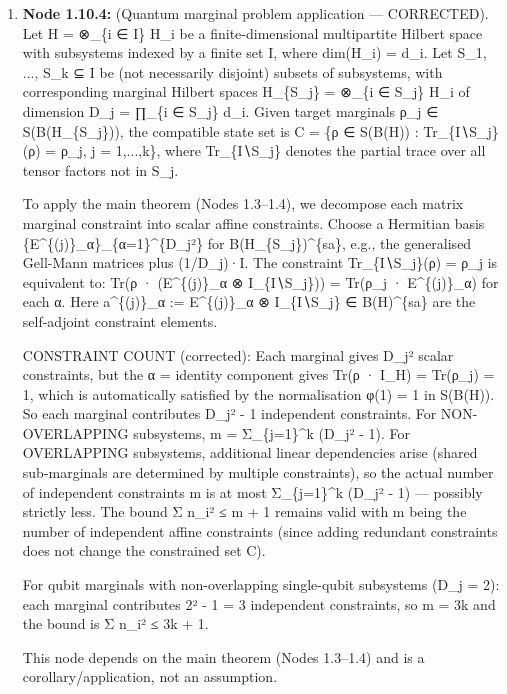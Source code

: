 \documentclass{article}
\begin{document}
\begin{enumerate}
\begin{enumerate}
  Type: claim, Inference: assumption, Status: pending, Taint: unresolved

\item \textbf{Node 1.10.4:} (Quantum marginal problem application — CORRECTED). Let H = ⊗\_\{i ∈ I\} H\_i be a finite-dimensional multipartite Hilbert space with subsystems indexed by a finite set I, where dim(H\_i) = d\_i. Let S\_1, ..., S\_k ⊆ I be (not necessarily disjoint) subsets of subsystems, with corresponding marginal Hilbert spaces H\_\{S\_j\} = ⊗\_\{i ∈ S\_j\} H\_i of dimension D\_j = ∏\_\{i ∈ S\_j\} d\_i. Given target marginals ρ\_j ∈ S(B(H\_\{S\_j\})), the compatible state set is C = \{ρ ∈ S(B(H)) : Tr\_\{I∖S\_j\}(ρ) = ρ\_j, j = 1,...,k\}, where Tr\_\{I∖S\_j\} denotes the partial trace over all tensor factors not in S\_j.

To apply the main theorem (Nodes 1.3–1.4), we decompose each matrix marginal constraint into scalar affine constraints. Choose a Hermitian basis \{E\textasciicircum{}\{(j)\}\_α\}\_\{α=1\}\textasciicircum{}\{D\_j²\} for B(H\_\{S\_j\})\textasciicircum{}\{sa\}, e.g., the generalised Gell-Mann matrices plus (1/D\_j)·I. The constraint Tr\_\{I∖S\_j\}(ρ) = ρ\_j is equivalent to: Tr(ρ · (E\textasciicircum{}\{(j)\}\_α ⊗ I\_\{I∖S\_j\})) = Tr(ρ\_j · E\textasciicircum{}\{(j)\}\_α) for each α. Here a\textasciicircum{}\{(j)\}\_α := E\textasciicircum{}\{(j)\}\_α ⊗ I\_\{I∖S\_j\} ∈ B(H)\textasciicircum{}\{sa\} are the self-adjoint constraint elements.

CONSTRAINT COUNT (corrected): Each marginal gives D\_j² scalar constraints, but the α = identity component gives Tr(ρ · I\_H) = Tr(ρ\_j) = 1, which is automatically satisfied by the normalisation φ(1) = 1 in S(B(H)). So each marginal contributes D\_j² - 1 independent constraints. For NON-OVERLAPPING subsystems, m = Σ\_\{j=1\}\textasciicircum{}k (D\_j² - 1). For OVERLAPPING subsystems, additional linear dependencies arise (shared sub-marginals are determined by multiple constraints), so the actual number of independent constraints m is at most Σ\_\{j=1\}\textasciicircum{}k (D\_j² - 1) — possibly strictly less. The bound Σ n\_i² ≤ m + 1 remains valid with m being the number of independent affine constraints (since adding redundant constraints does not change the constrained set C).

For qubit marginals with non-overlapping single-qubit subsystems (D\_j = 2): each marginal contributes 2² - 1 = 3 independent constraints, so m = 3k and the bound is Σ n\_i² ≤ 3k + 1.

This node depends on the main theorem (Nodes 1.3–1.4) and is a corollary/application, not an assumption.


\end{enumerate}
\end{enumerate}
\end{document}
